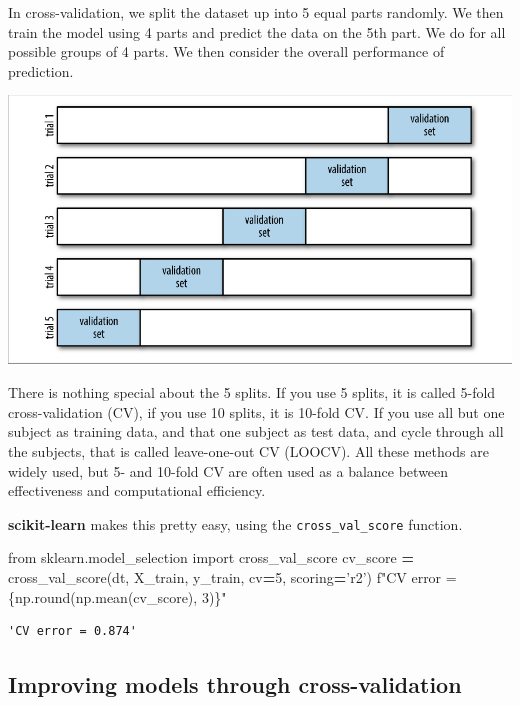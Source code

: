 \documentclass[
  letterpaper,
]{scrbook}
\newenvironment{Shaded}{\begin{snugshade}}{\end{snugshade}}
\newcommand{\BuiltInTok}[1]{#1}
\newcommand{\DecValTok}[1]{\textcolor[rgb]{0.00,0.00,0.81}{#1}}
\newcommand{\ImportTok}[1]{#1}
\newcommand{\NormalTok}[1]{#1}
\newcommand{\OperatorTok}[1]{\textcolor[rgb]{0.81,0.36,0.00}{\textbf{#1}}}
\newcommand{\SpecialCharTok}[1]{\textcolor[rgb]{0.00,0.00,0.00}{#1}}
\newcommand{\SpecialStringTok}[1]{\textcolor[rgb]{0.31,0.60,0.02}{#1}}
\newcommand{\StringTok}[1]{\textcolor[rgb]{0.31,0.60,0.02}{#1}}
\begin{document}
In cross-validation, we split the dataset up into 5 equal parts randomly. We then train the
model using 4 parts and predict the data on the 5th part. We do for all possible groups of 4 parts. We then
consider the overall performance of prediction.

\includegraphics{graphs/CV5.png}

There is nothing special about the 5 splits. If you use 5 splits, it is called 5-fold cross-validation (CV), if you use 10 splits, it is 10-fold CV. If you use all but one subject as training data, and that one subject as test data, and cycle through all the subjects, that is called leave-one-out CV (LOOCV). All these methods are widely used, but 5- and 10-fold CV are often used as a balance between effectiveness and computational efficiency.

\textbf{scikit-learn} makes this pretty easy, using the \texttt{cross\_val\_score} function.

\begin{Shaded}
\begin{Highlighting}[]
\ImportTok{from}\NormalTok{ sklearn.model_selection }\ImportTok{import}\NormalTok{ cross_val_score}
\NormalTok{cv_score }\OperatorTok{=}\NormalTok{ cross_val_score(dt, X_train, y_train, cv}\OperatorTok{=}\DecValTok{5}\NormalTok{, scoring}\OperatorTok{=}\StringTok{'r2'}\NormalTok{)}
\SpecialStringTok{f"CV error = }\SpecialCharTok{\{np.}\BuiltInTok{round}\NormalTok{(np.mean(cv_score), }\DecValTok{3}\NormalTok{)}\SpecialCharTok{\}}\SpecialStringTok{"}
\end{Highlighting}
\end{Shaded}

\begin{verbatim}
'CV error = 0.874'
\end{verbatim}

\hypertarget{improving-models-through-cross-validation}{%
\subsection{Improving models through cross-validation}\label{improving-models-through-cross-validation}}
\end{document}
